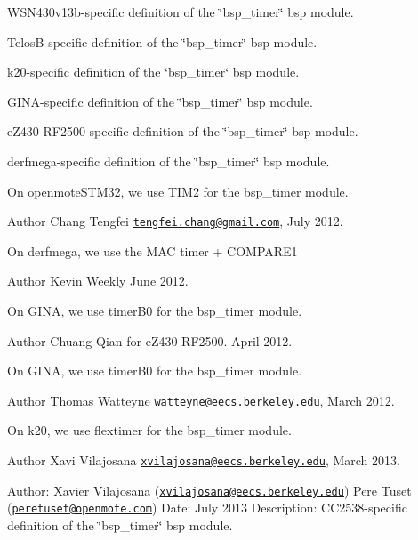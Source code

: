 W\+S\+N430v13b-\/specific definition of the \char`\"{}bsp\+\_\+timer\char`\"{} bsp module.

Telos\+B-\/specific definition of the \char`\"{}bsp\+\_\+timer\char`\"{} bsp module.

k20-\/specific definition of the \char`\"{}bsp\+\_\+timer\char`\"{} bsp module.

G\+I\+N\+A-\/specific definition of the \char`\"{}bsp\+\_\+timer\char`\"{} bsp module.

e\+Z430-\/\+R\+F2500-\/specific definition of the \char`\"{}bsp\+\_\+timer\char`\"{} bsp module.

derfmega-\/specific definition of the \char`\"{}bsp\+\_\+timer\char`\"{} bsp module.

On openmote\+S\+T\+M32, we use T\+I\+M2 for the bsp\+\_\+timer module.

\begin{DoxyAuthor}{Author}
Chang Tengfei \href{mailto:tengfei.chang@gmail.com}{\tt tengfei.\+chang@gmail.\+com}, July 2012.
\end{DoxyAuthor}
On derfmega, we use the M\+AC timer + C\+O\+M\+P\+A\+R\+E1

\begin{DoxyAuthor}{Author}
Kevin Weekly June 2012.
\end{DoxyAuthor}
On G\+I\+NA, we use timer\+B0 for the bsp\+\_\+timer module.

\begin{DoxyAuthor}{Author}
Chuang Qian for e\+Z430-\/\+R\+F2500. April 2012.
\end{DoxyAuthor}
On G\+I\+NA, we use timer\+B0 for the bsp\+\_\+timer module.

\begin{DoxyAuthor}{Author}
Thomas Watteyne \href{mailto:watteyne@eecs.berkeley.edu}{\tt watteyne@eecs.\+berkeley.\+edu}, March 2012.
\end{DoxyAuthor}
On k20, we use flextimer for the bsp\+\_\+timer module.

\begin{DoxyAuthor}{Author}
Xavi Vilajosana \href{mailto:xvilajosana@eecs.berkeley.edu}{\tt xvilajosana@eecs.\+berkeley.\+edu}, March 2013.
\end{DoxyAuthor}
Author\+: Xavier Vilajosana (\href{mailto:xvilajosana@eecs.berkeley.edu}{\tt xvilajosana@eecs.\+berkeley.\+edu}) Pere Tuset (\href{mailto:peretuset@openmote.com}{\tt peretuset@openmote.\+com}) Date\+: July 2013 Description\+: C\+C2538-\/specific definition of the \char`\"{}bsp\+\_\+timer\char`\"{} bsp module.

